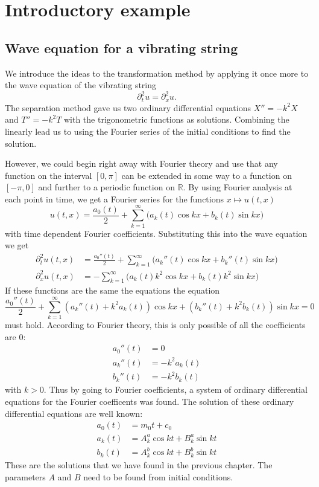 %
%
%
\section{Introductory example}
\subsection{Wave equation for a vibrating string}
We introduce the ideas to the transformation method by applying it
once more to the wave equation of the vibrating string
\[
\partial_t^2u=\partial_x^2u.
\]
The separation method gave us two ordinary differential equations
$X''=-k^2X$ and $T''=-k^2T$ with the trigonometric functions as
solutions.
Combining the linearly lead us to using the Fourier series of the
initial conditions to find the solution.

However, we could begin right away with Fourier theory and
use that any function on the interval $[0,\pi]$ can be extended
in some way to a function on $[-\pi,0]$ and further to a periodic
function on $\mathbb R$.
By using Fourier analysis at each point in time, we get a
Fourier series for the functions $x\mapsto u(t,x)$
\[
u(t,x)
=
\frac{a_0(t)}2+\sum_{k=1}^\infty \bigl( a_k(t)\cos kx+b_k(t)\sin kx \bigr)
\]
with time dependent Fourier coefficients.
Substituting this into the wave equation we get
\begin{align*}
\partial_t^2u(t,x)&=\frac{a_0''(t)}2
+\sum_{k=1}^\infty\bigl( a_k''(t)\cos kx+b_k''(t)\sin kx\bigr)\\
\partial_x^2u(t,x)&=
-\sum_{k=1}^\infty \bigl(a_k(t)k^2\cos kx+b_k(t)k^2\sin kx \bigr)
\end{align*}
If these functions are the same the equations
the equation
\[
\frac{a_0''(t)}2
+\sum_{k=1}^\infty (a_k''(t)+k^2a_k(t))\cos kx+(b_k''(t)+k^2b_k(t))\sin kx=0
\]
must hold.
According to Fourier theory, this is only possible of all the coefficients
are $0$:
\begin{align*}
a_0''(t)&=0\\
a_k''(t)&=-k^2a_k(t)\\
b_k''(t)&=-k^2b_k(t)
\end{align*}
with $k>0$.
Thus by going to Fourier coefficients, a system of ordinary differential
equations for the Fourier coefficents was found.
The solution of these ordinary differential equations are well known:
\begin{align*}
a_0(t)&=m_0t+c_0\\
a_k(t)&=A^a_k\cos kt+B^a_k\sin kt\\
b_k(t)&=A^b_k\cos kt+B^b_k\sin kt
\end{align*}
These are the solutions that we have found in the previous chapter.
The parameters $A$ and $B$ need to be found from initial conditions.

